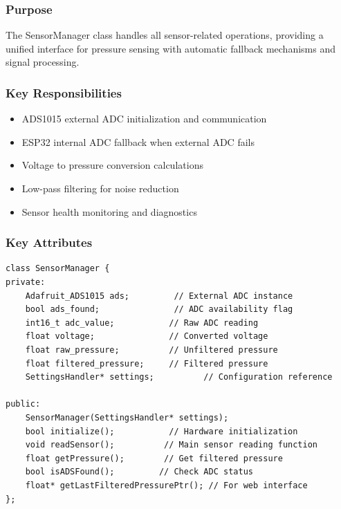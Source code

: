 \documentclass[12pt,a4paper]{article}
\begin{document}
\subsubsection{Purpose}
The SensorManager class handles all sensor-related operations, providing a unified interface for pressure sensing with automatic fallback mechanisms and signal processing.

\subsubsection{Key Responsibilities}
\begin{itemize}
    \item ADS1015 external ADC initialization and communication
    \item ESP32 internal ADC fallback when external ADC fails
    \item Voltage to pressure conversion calculations
    \item Low-pass filtering for noise reduction
    \item Sensor health monitoring and diagnostics
\end{itemize}

\subsubsection{Key Attributes}
\begin{lstlisting}[caption=SensorManager Class Structure]
class SensorManager {
private:
    Adafruit_ADS1015 ads;         // External ADC instance
    bool ads_found;               // ADC availability flag
    int16_t adc_value;           // Raw ADC reading
    float voltage;               // Converted voltage
    float raw_pressure;          // Unfiltered pressure
    float filtered_pressure;     // Filtered pressure
    SettingsHandler* settings;          // Configuration reference
    
public:
    SensorManager(SettingsHandler* settings);
    bool initialize();           // Hardware initialization
    void readSensor();          // Main sensor reading function
    float getPressure();        // Get filtered pressure
    bool isADSFound();         // Check ADC status
    float* getLastFilteredPressurePtr(); // For web interface
};
\end{lstlisting}
\end{document}
